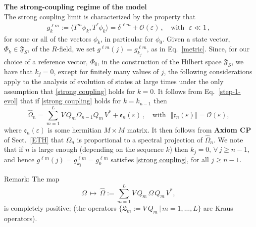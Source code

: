 \documentclass[12pt]{article}
\begin{document}
{{\bf{The strong-coupling regime of the model}}\\

The strong coupling limit is characterized by the property that
\begin{align}\label{strong coupling}
g_{k}^ {\ell m} := \langle T^{m} \phi_{k}, T^{\ell} \phi_{k} \rangle = \delta^{\,\ell m} + \mathcal{O}(\varepsilon)\,, \quad \text{with }\,\,\varepsilon \ll 1\,,
\end{align}
for some or all of the vectors $\phi_{k}$, in particular for $\phi_0$. Given a state vector, 
$\Phi_{{k}}\in \mathfrak{F}_S$, of the $R$-field, we set $g^{\ell m}(j)= g_{k_j}^{\ell m}$, 
as in Eq.~\eqref{metric}. Since, for our choice of a reference vector, $\Phi_{{0}}$, in the construction 
of the Hilbert space $\mathfrak{F}_S$, we have that $k_j = 0$, except for finitely many values of $j$, 
the following considerations apply to the analysis of evolution of states at large times under the only assumption that \eqref{strong coupling} holds for $k =0$. 
It follows from Eq.~\eqref{step-1-evol} that if \eqref{strong coupling} holds for $k=k_{n-1}$ then
\begin{equation}\label{Markovian}
\widehat{\Omega}_n = \sum_{m=1}^{L} V\,Q_m \Omega_{n-1} Q_m \,V^{*}+ \mathfrak{e}_{n}(\varepsilon)\,, \quad \text{with }
\,\, \Vert \mathfrak{e}_{n}(\varepsilon) \Vert = \mathcal{O}(\varepsilon),
\end{equation}
where $\mathfrak{e}_n(\varepsilon)$ is some hermitian $M\times M$ matrix. It then follows from {\bf{Axiom CP}} 
of Sect.~\ref{ETH}  that $\Omega_n$ is proportional to a spectral projection of $\widehat{\Omega}_n$.
We note that if $n$ is large enough (depending on the sequence ${k}$) then $k_j =0, \,\forall \, j\geq n-1$, 
and hence $g^{\ell m}(j) = g_{k_j}^{\ell m} = g_{0}^{\ell m}$ satisfies \eqref{strong coupling}, for all $j \geq n-1$. 

{Remark}: The map
\begin{equation}\label{CP}
\Omega\, \mapsto\, \widehat{\Omega} := \sum_{m =1}^{L} V\,Q_{m}\, \Omega \, Q_{m} \, V^{*}, 
\end{equation}
is completely positive; (the operators $\big\{\mathfrak{L}_{m}:=V\,Q_{m}\,\vert\, m=1,\dots, L\big\}$ are Kraus operators). \\

}
\end{document}
